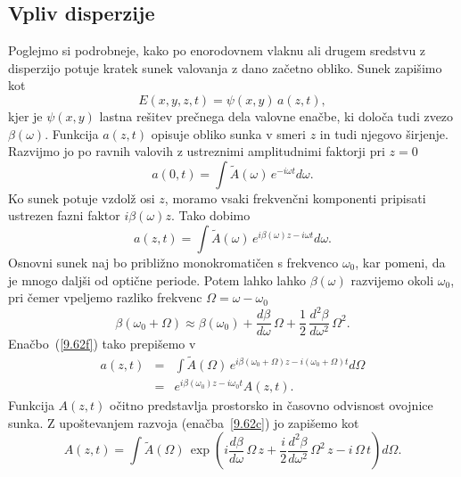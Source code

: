 \subsection*{Vpliv disperzije}
Poglejmo si podrobneje, kako po enorodovnem vlaknu ali drugem
sredstvu z disperzijo potuje kratek sunek valovanja z dano začetno obliko.
Sunek zapišimo kot  
\begin{equation}
E\left(x, y, z, t\right)=\psi\left(x,y\right)\, a\left(z,t\right),
\label{9.61}
\end{equation}
kjer je $\psi\left(x,y\right)$ lastna rešitev prečnega dela valovne
enačbe, ki določa tudi zvezo $\beta\left(\omega\right)$. 
Funkcija $a\left(z,t\right)$ opisuje obliko sunka v smeri $z$ in tudi njegovo
širjenje. Razvijmo jo po ravnih valovih z ustreznimi amplitudnimi faktorji 
pri $z=0$ 
\begin{equation}
a\left(0,t\right)=\int \tilde{A}(\omega)\, e^{- i\omega t}d\omega.
\label{9.62}
\end{equation}
Ko sunek potuje vzdolž osi $z$, moramo vsaki frekvenčni komponenti pripisati
ustrezen fazni faktor $i \beta (\omega) z$. Tako dobimo 
\begin{equation}
a\left(z,t\right)=\int \tilde{A}(\omega)\, e^{i \beta (\omega) z - i\omega t}d\omega.
\label{9.62f}
\end{equation}
Osnovni sunek naj bo približno monokromatičen s frekvenco $\omega_{0}$,
kar pomeni, da je mnogo daljši od optične periode. Potem lahko lahko $\beta(\omega)$
razvijemo okoli $\omega_{0}$, pri čemer vpeljemo razliko frekvenc $\Omega = \omega - \omega_0$
\begin{equation}
\beta(\omega_0 + \Omega) \approx \beta(\omega_{0})
+\frac{d\beta}{d\omega}\,\Omega+\frac{1}{2}\,\frac{d^{2}\beta}{d\omega^{2}}\,\Omega^{2}.
\label{9.62c}
\end{equation}
Enačbo~(\ref{9.62f}) tako prepišemo v 
\begin{eqnarray}
a\left(z,t\right)&=&\int \tilde{A}(\Omega)\, e^{i \beta (\omega_0 + \Omega)z - 
i(\omega_0 + \Omega) t}d\Omega\\
& = & e^{i \beta (\omega_0)z - i\omega_0 t} A(z,t).
\label{9.62b}
\end{eqnarray}
Funkcija $A(z, t)$ očitno predstavlja prostorsko in časovno odvisnost ovojnice sunka. Z upoštevanjem
razvoja (enačba~\ref{9.62c}) jo zapišemo kot 
\begin{equation}
 A(z,t) = \int \tilde{A}(\Omega)\, \exp \left(i \frac{d\beta}{d\omega}\, 
 \Omega\,z + \frac{i}{2}\frac{d^2 \beta}{d\omega^2}
 \,\Omega^2\, z - i\, \Omega\, t\right) d\Omega.
\end{equation}
